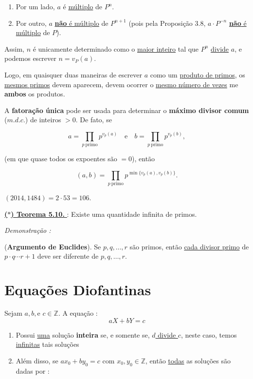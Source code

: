 \begin{enumerate}
    \item Por um lado, $a$ é \underline{múltiplo} de $P^n$.
    \item Por outro, $a$ \underline{\textbf{não} é múltiplo} de $P^{n+1}$ (pois pela Proposição 3.8, $a \cdot P^{-n}$ \underline{\textbf{não} é múltiplo} de $P$).      
\end{enumerate}

Assim, $n$ é unicamente determinado como o \underline{maior inteiro} tal que $P^n$ \underline{divide} $a$, e podemos escrever $n = v_P(a)$. 

Logo, em quaisquer duas maneiras de escrever $a$ como um \underline{produto de primos}, os \underline{mesmos primos} devem aparecem, devem ocorrer o \underline{mesmo número de vezes} me \textbf{ambos} os produtos.  

\begin{exemplo}
    A \textbf{fatoração única} pode ser usada para determinar o \textbf{máximo divisor comum} ($m.d.c.$) de inteiros $> 0$. 
    De fato, se 
    
    \[
    a = \prod_{p \ \text{primo}} p^{v_p(a)} 
    \quad \text{e} \quad 
    b = \prod_{p \ \text{primo}} p^{v_p(b)} ,
    \]
    
    (em que quase todos os expoentes são $= 0$), então
    
    \[
    (a, b) = \prod_{p \ \text{primo}} p^{\min\{v_p(a),v_p(b)\}}.
    \]  

    $(2014, 1484) = 2 \cdot 53 = 106$.
\end{exemplo}

\vspace{0.2cm}
\noindent\underline{\underline{\textbf{($\ast$) Teorema 5.10. }}} : Existe uma quantidade infinita de primos.

\vspace{0.2cm}
\noindent\textit{Demonstração : }

(\textbf{Argumento de Euclides}). Se $p, q, \ldots , r$ são primos, então \underline{cada divisor primo} de $p \cdot q \cdots r +1$
deve ser diferente de $p, q, \ldots , r$.

\section*{Equações Diofantinas}

Sejam $a,b, \text{e } c \in \mathbb{Z}$. A equação : 
\[
aX + bY = c
\]

\begin{enumerate}[label=\roman*.]
    \item Possui \underline{uma} solução \textbf{inteira} se, e somente se, \underline{$d$ divide $c$}, neste caso, temos \underline{infinitas} 
    tais soluções 
    \item Além disso, se $ ax_0 + by_0 = c $ com $x_0,y_0 \in \mathbb{Z}$, então \underline{todas} as soluções são dadas por : 
\end{enumerate}

